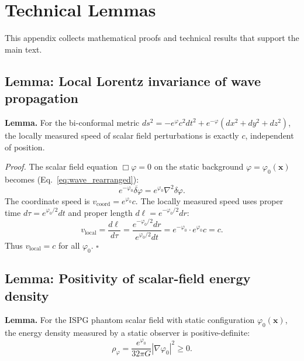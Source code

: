 \documentclass[aps,prd,onecolumn,superscriptaddress,nofootinbib,showpacs,12pt,notitlepage]{revtex4-2}
\begin{document}
\appendix

\section{Technical Lemmas}
\label{app:lemmas}

This appendix collects mathematical proofs and technical
results that support the main text.

\subsection{Lemma: Local Lorentz invariance of wave propagation}
\label{app:lemma_lorentz}

\textbf{Lemma.}  For the bi-conformal metric $ds^2 = -e^{\varphi}c^2dt^2 +
e^{-\varphi}(dx^2+dy^2+dz^2)$, the locally measured speed of scalar
field perturbations is exactly $c$, independent of position.

\textit{Proof.}  The scalar field equation $\Box\varphi = 0$ on the
static background $\varphi = \varphi_0(\mathbf{x})$ becomes (Eq.~\ref{eq:wave_rearranged}):
\begin{equation}
  e^{-\varphi_0}\ddot{\delta\varphi} = e^{\varphi_0}\nabla^2\delta\varphi.
\end{equation}
The coordinate speed is $v_{\mathrm{coord}} = e^{\varphi_0}c$.  The
locally measured speed uses proper time $d\tau = e^{\varphi_0/2}dt$
and proper length $d\ell = e^{-\varphi_0/2}dr$:
\begin{equation}
  v_{\mathrm{local}} = \frac{d\ell}{d\tau}
  = \frac{e^{-\varphi_0/2}dr}{e^{\varphi_0/2}dt}
  = e^{-\varphi_0} \cdot e^{\varphi_0}c = c.
\end{equation}
Thus $v_{\mathrm{local}} = c$ for all $\varphi_0$. \hfill $\square$

\subsection{Lemma: Positivity of scalar-field energy density}
\label{app:lemma_positive}

\textbf{Lemma.}  For the ISPG phantom scalar field with static
configuration $\varphi_0(\mathbf{x})$, the energy density measured
by a static observer is positive-definite:
\begin{equation}
  \rho_\varphi = \frac{e^{\varphi_0}}{32\pi G}|\nabla\varphi_0|^2 \geq 0.
\end{equation}
\end{document}
